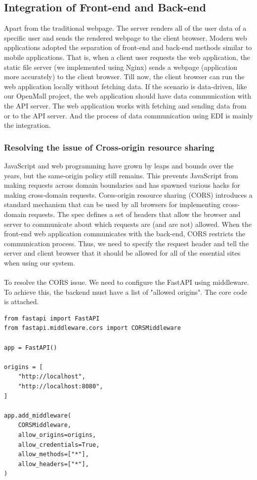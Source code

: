\documentclass{article}
\begin{document}
\subsection{Integration of Front-end and Back-end}

Apart from the traditional webpage. The server renders all of the user data of a specific user and sends the rendered webpage to the client browser. Modern web applications adopted the separation of front-end and back-end methods similar to mobile applications. That is, when a client user requests the web application, the static file server (we implemented using Nginx) sends a webpage (application more accurately) to the client browser. Till now, the client browser can run the web application locally without fetching data. If the scenario is data-driven, like our OpenMall project, the web application should have data communication with the API server. The web application works with fetching and sending data from or to the API server. And the process of data communication using EDI is mainly the integration.

\subsubsection{Resolving the issue of Cross-origin resource sharing}

JavaScript and web programming have grown by leaps and bounds over the years, but the same-origin policy still remains. This prevents JavaScript from making requests across domain boundaries and has spawned various hacks for making cross-domain requests. Corss-origin resource sharing (CORS)\cite{cors} introduces a standard mechanism that can be used by all browsers for implementing cross-domain requests. The spec defines a set of headers that allow the browser and server to communicate about which requests are (and are not) allowed. When the front-end web application communicates with the back-end, CORS restricts the communication process. Thus, we need to specify the request header and tell the server and client browser that it should be allowed for all of the essential sites when using our system.
\\\\
To resolve the CORS issue. We need to configure the FastAPI using middleware. To achieve this, the backend must have a list of "allowed origins". The core code is attached.
\begin{verbatim}
from fastapi import FastAPI
from fastapi.middleware.cors import CORSMiddleware

app = FastAPI()

origins = [
    "http://localhost",
    "http://localhost:8080",
]

app.add_middleware(
    CORSMiddleware,
    allow_origins=origins,
    allow_credentials=True,
    allow_methods=["*"],
    allow_headers=["*"],
)
\end{verbatim}
\end{document}
